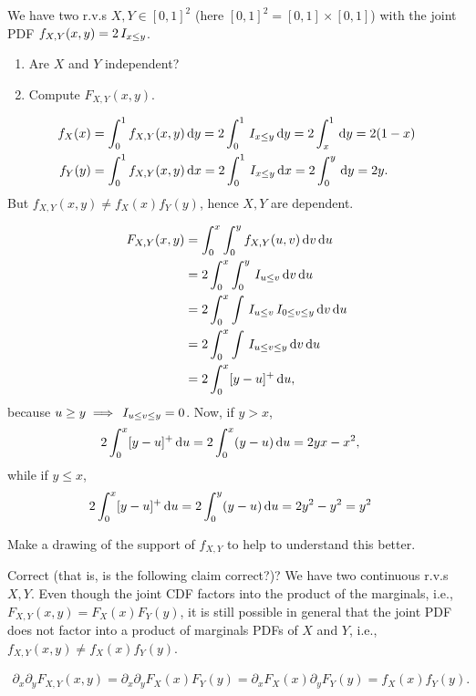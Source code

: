\documentclass[assignments]{subfiles}
\begin{document}
\begin{exercise}
We have two r.v.s $X, Y \in [0,1]^{2}$ (here $[0,1]^{2} = [0,1]\times [0,1]$) with the joint PDF $f_{X,Y}(x,y) = 2 \,I_{x\leq y}$.
\begin{enumerate}
\item Are $X$ and $Y$ independent?
\item Compute $F_{X,Y}(x,y)$.
\end{enumerate}
\begin{solution}
\begin{align}
f_{X}(x) &= \int_{0}^{1} f_{X,Y}(x,y) \,\textrm{d}y = 2\int_{0}^{1} \,I_{x\leq y} \,\textrm{d}y = 2\int_{x}^{1} \,\textrm{d}y = 2(1-x) \\
f_{Y}(y) &= \int_{0}^{1} f_{X,Y}(x,y) \,\textrm{d}x = 2\int_{0}^{1} \,I_{x\leq y} \,\textrm{d}x = 2\int_{0}^{y} \,\textrm{d}y = 2 y.
\end{align}
But $f_{X,Y}(x,y) \neq f_{X}(x)f_{Y}(y)$, hence $X,Y$ are dependent.

\begin{align}
F_{X,Y}(x,y)
&= \int_{0}^{x}\int_{0}^{y} f_{X,Y}(u,v) \,\textrm{d}v \,\textrm{d}u \\
&= 2\int_{0}^{x}\int_{0}^{y} \,I_{u\leq v} \,\textrm{d}v \,\textrm{d}u \\
&= 2\int_{0}^{x}\int \,I_{u\leq v} \,I_{0\leq v \leq y}\,\textrm{d}v \,\textrm{d}u \\
&= 2\int_{0}^{x}\int  \,I_{u\leq v \leq y}\,\textrm{d}v \,\textrm{d}u \\
&= 2\int_{0}^{x} [y-u]^{+} \,\textrm{d}u,
\end{align}
because $u\geq y \implies \,I_{u\leq v \leq y} = 0$. Now, if $y>x$,
\begin{align}
  2\int_{0}^{x} [y-u]^{+} \,\textrm{d}u &=
  2\int_{0}^{x} (y-u) \,\textrm{d}u = 2 y x - x^{2},
\end{align}
while if $y\leq x$,
\begin{align}
  2\int_{0}^{x} [y-u]^{+} \,\textrm{d}u &=
  2\int_{0}^{y} (y-u) \,\textrm{d}u = 2 y^{2} - y^{2} = y^{2}
\end{align}

Make a drawing of the support of $f_{X,Y}$ to help to understand this better.

\end{solution}
\end{exercise}

\begin{exercise}
Correct (that is, is the following claim correct?)?
We have two continuous r.v.s $X, Y$.
Even though the joint CDF factors into the product of the marginals, i.e., $F_{X,Y}(x,y) = F_X(x)F_Y(y)$, it is still possible in general that the joint PDF does not factor into a product of marginals PDFs of $X$ and $Y$, i.e., $f_{X,Y}(x,y) \neq f_X(x) f_Y(y)$.
\begin{solution}
\begin{align*}
\partial_{x}\partial_{y}F_{X,Y}(x,y)
=\partial_{x}\partial_{y}F_{X}(x) F_{Y}(y)
=\partial_{x}F_{X}(x) \partial_{y} F_{Y}(y) = f_{X}(x) f_{Y}(y).
\end{align*}
\end{solution}
\end{exercise}
\end{document}
